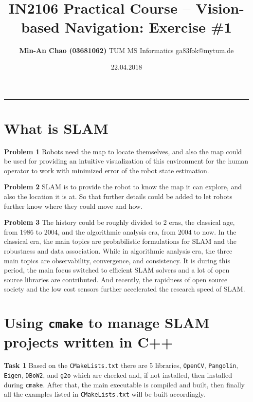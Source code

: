 \documentclass[12pt,a4paper]{article}
\makeatletter
\newcommand{\docTitle}{IN2106 Practical Course -- Vision-based Navigation: Exercise \#1}
\newcommand{\docAuthor}{Min-An Chao (03681062)}
\newcommand{\docAuthorDept}{TUM MS Informatics}
\newcommand{\docAuthorEmail}{ga83fok@mytum.de}
\newcommand{\docDate}{22.04.2018}
\makeatother
\begin{document}
    \title{\vspace{-1.75cm} \large \textsf{\textbf{\docTitle}}}
    \author{\normalsize \textsf{
        \textbf{\docAuthor} \hspace{6pt}\textbar\hspace{6pt}
        \docAuthorDept \hspace{6pt}\textbar\hspace{6pt}
        \docAuthorEmail}}
    \date{\small \textsf{\docDate}}
    \maketitle 
    \thispagestyle{fancy}
    \vspace{-0.5cm}
    \hrule

    \section{What is SLAM}
   
    \textsf{\textbf{Problem 1}}
    Robots need the map to locate themselves, 
    and also the map could be used for
    providing an intuitive visualization of this environment
    for the human operator to work
    with minimized error of the robot state estimation.
    
    \textsf{\textbf{Problem 2}}
    SLAM is to provide the robot to know the map it can explore,
    and also the location it is at.
    So that further details could be added to let
    robots further know where they could move and how.

    \textsf{\textbf{Problem 3}}
    The history could be roughly divided to 2 eras,
    the classical age, from 1986 to 2004, 
    and the algorithmic analysis era, from 2004 to now.
    In the classical era,
    the main topics are probabilistic formulations for SLAM
    and the robustness and data association.
    While in algorithmic analysis era, 
    the three main topics are observability,
    convergence, and consistency.
    It is during this period,
    the main focus switched to efficient SLAM solvers
    and a lot of open source libraries are contributed.
    And recently, the rapidness of open source society
    and the low cost sensors further accelerated the
    research speed of SLAM.


    \section{Using \texttt{cmake} to manage SLAM projects written in C++}
    \textsf{\textbf{Task 1}}
    Based on the \texttt{CMakeLists.txt}
    there are 5 libraries, 
    \texttt{OpenCV}, \texttt{Pangolin}, \texttt{Eigen}, \texttt{DBoW2}, and \texttt{g2o}
    which are checked and, if not installed, then installed during \texttt{cmake}.
    After that, the main executable is compiled and built,
    then finally all the examples listed in \texttt{CMakeLists.txt}
    will be built accordingly.
\end{document}
